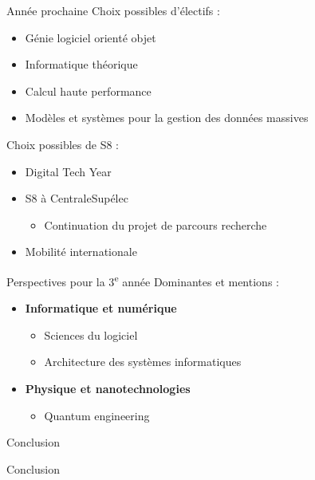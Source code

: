 \documentclass[french]{beamer}
\begin{document}
\begin{frame}{Année prochaine}
Choix possibles d'électifs :
\begin{itemize}
    \item Génie logiciel orienté objet
    \item Informatique théorique
    \item Calcul haute performance
    \item Modèles et systèmes pour la gestion des données massives
\end{itemize}
\vspace{1em}
\pause
Choix possibles de S8 :
\begin{itemize}
    \item Digital Tech Year
    \item S8 à CentraleSupélec
    \begin{itemize}
        \item Continuation du projet de parcours recherche
    \end{itemize}
    \item Mobilité internationale
\end{itemize}

\end{frame}

\begin{frame}{Perspectives pour la 3\textsuperscript{e} année}
Dominantes et mentions :
\begin{itemize}
    \item \textbf{Informatique et numérique}
    \begin{itemize}
        \item Sciences du logiciel
        \item Architecture des systèmes informatiques
    \end{itemize}
    \item \textbf{Physique et nanotechnologies}
    \begin{itemize}
        \item Quantum engineering
    \end{itemize}
\end{itemize}
\end{frame}

\begin{frame}{Conclusion}
\begin{center}
    \huge{Conclusion}
\end{center}
\end{frame}
\end{document}

